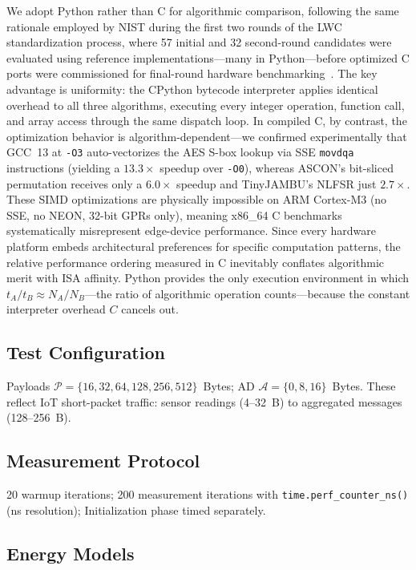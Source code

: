 \documentclass[11pt,a4paper]{article}
\begin{document}
We adopt Python rather than C for algorithmic comparison, following the same rationale employed by NIST during the first two rounds of the LWC standardization process, where 57 initial and 32 second-round candidates were evaluated using reference implementations---many in Python---before optimized C ports were commissioned for final-round hardware benchmarking~\cite{nistir8454}. The key advantage is uniformity: the CPython bytecode interpreter applies identical overhead to all three algorithms, executing every integer operation, function call, and array access through the same dispatch loop. In compiled C, by contrast, the optimization behavior is algorithm-dependent---we confirmed experimentally that GCC~13 at {\tt -O3} auto-vectorizes the AES S-box lookup via SSE {\tt movdqa} instructions (yielding a $13.3\times$ speedup over {\tt -O0}), whereas ASCON's bit-sliced permutation receives only a $6.0\times$ speedup and TinyJAMBU's NLFSR just $2.7\times$. These SIMD optimizations are physically impossible on ARM Cortex-M3 (no SSE, no NEON, 32-bit GPRs only), meaning x86\_64 C benchmarks systematically misrepresent edge-device performance. Since every hardware platform embeds architectural preferences for specific computation patterns, the relative performance ordering measured in C inevitably conflates algorithmic merit with ISA affinity. Python provides the only execution environment in which $t_A / t_B \approx N_A / N_B$---the ratio of algorithmic operation counts---because the constant interpreter overhead $C$ cancels out.

\subsection{Test Configuration}

Payloads $\mathcal{P} = \{16, 32, 64, 128, 256, 512\}$~Bytes; AD $\mathcal{A} = \{0, 8, 16\}$~Bytes. These reflect IoT short-packet traffic: sensor readings (4--32~B) to aggregated messages (128--256~B).

\subsection{Measurement Protocol}

20 warmup iterations; 200 measurement iterations with \texttt{time.perf\_counter\_ns()} (ns resolution); Initialization phase timed separately.

\subsection{Energy Models}
\end{document}
